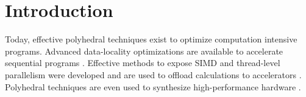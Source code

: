 \label{chap:polly}

\section{Introduction}

Today, effective polyhedral techniques exist to optimize computation intensive
programs.  Advanced data-locality optimizations are available to accelerate
sequential programs \cite{uday08pldi}. Effective methods to expose SIMD and
thread-level parallelism were developed and are used to offload calculations to
accelerators \cite{Baskaran10, Baghdadi_puttingautomatic}.  Polyhedral
techniques are even used to synthesize high-performance hardware
\cite{RISSET:2008}.

